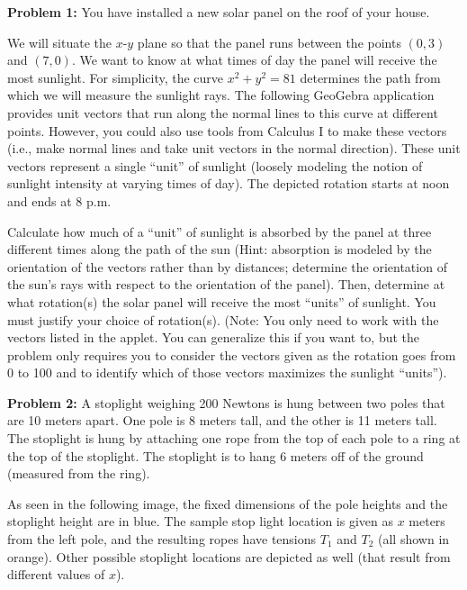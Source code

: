 \documentclass{ximera}
\begin{document}
\textbf{Problem 1:} You have installed a new solar panel on the roof of your house.

We will situate the $x$-$y$ plane so that the panel runs between the points $(0,3)$ and $(7,0)$. We want to know at what times of day the panel will receive the most sunlight. For simplicity, the curve $x^2+y^2=81$ determines the path from which we will measure the sunlight rays. The following GeoGebra application provides unit vectors that run along the normal lines to this curve at different points. However, you could also use tools from Calculus I to make these vectors (i.e., make normal lines and take unit vectors in the normal direction). These unit vectors represent a single ``unit'' of sunlight (loosely modeling the notion of sunlight intensity at varying times of day). The depicted rotation starts at noon and ends at 8 p.m.

\begin{center}
\end{center}

Calculate how much of a ``unit'' of sunlight is absorbed by the panel at three different times along the path of the sun (Hint: absorption is modeled by the orientation of the vectors rather than by distances; determine the orientation of the sun's rays with respect to the orientation of the panel). Then, determine at what rotation(s) the solar panel will receive the most ``units'' of sunlight. You must justify your choice of rotation(s). (Note: You only need to work with the vectors listed in the applet. You can generalize this if you want to, but the problem only requires you to consider the vectors given as the rotation goes from 0 to 100 and to identify which of those vectors maximizes the sunlight ``units'').

\textbf{Problem 2:} A stoplight weighing 200 Newtons is hung between two poles that are 10 meters apart. One pole is 8 meters tall, and the other is 11 meters tall. The stoplight is hung by attaching one rope from the top of each pole to a ring at the top of the stoplight. The stoplight is to hang 6 meters off of the ground (measured from the ring).

As seen in the following image, the fixed dimensions of the pole heights and the stoplight height are in blue. The sample stop light location is given as $x$ meters from the left pole, and the resulting ropes have tensions $T_1$ and $T_2$ (all shown in orange). Other possible stoplight locations are depicted as well (that result from different values of $x$).
\end{document}
